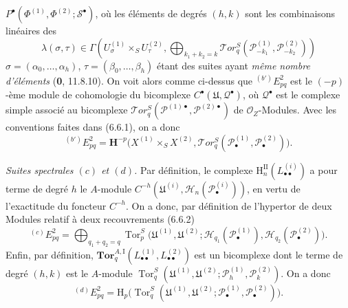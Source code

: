 \begin{env}[6.6.4]
$P^\bullet(\Phi^{(1)},\Phi^{(2)};\mathscr S^\bullet)$, où les éléments de
degrés $(h,k)$ sont les combinaisons linéaires des
\[
  \lambda(\sigma,\tau)\in
  \Gamma\left(U_\sigma^{(1)}\times_S U_\tau^{(2)},
    \bigoplus_{k_1+k_2=k}
    \mathscr{T}\!or_q^S
    (\mathscr P_{-k_1}^{(1)},\mathscr P_{-k_2}^{(2)})\right)
\]
$\sigma=(\alpha_0,\ldots,\alpha_h)$,
$\tau=(\beta_0,\ldots,\beta_h)$ étant des suites ayant \emph{même nombre
d'éléments} (\textbf{0}, 11.8.10). On voit alors comme ci-dessus que
${}^{(b')}E_{pq}^2$ est le $(-p)$-ème module de cohomologie du
bicomplexe $C^\bullet(\mathfrak U,\mathscr Q^\bullet)$, où
$\mathscr Q^\bullet$ est le complexe simple associé au bicomplexe
$\mathscr{T}\!or_q^S
(\mathscr P^{(1)\bullet},\mathscr P^{(2)\bullet})$ de
$\mathscr O_Z$-Modules. Avec les conventions faites dans (6.6.1), on a donc
\[
  {}^{(b')}E_{pq}^2
  =\mathbf H^{-p}\bigl(X^{(1)}\times_S X^{(2)},
    \mathscr{T}\!or_q^S
    (\mathscr P_\bullet^{(1)},\mathscr P_\bullet^{(2)})\bigr).
\]
\end{env}

\begin{env}[6.6.5]
\emph{Suites spectrales $(c)$ et $(d)$.} Par définition, le complexe
$\mathrm H_n^{\mathrm{II}}(L_{\bullet\bullet}^{(i)})$ a pour terme de degré
$h$ le $A$-module
$C^{-h}(\mathfrak U^{(i)},\mathscr H_n(\mathscr P_\bullet^{(i)}))$, en vertu
de l'exactitude du foncteur $C^{-h}$. On a donc, par définition de l'hypertor
de deux Modules relatif à deux recouvrements (6.6.2)
\[
  {}^{(c)}E_{pq}^2
  =\bigoplus_{q_1+q_2=q}
   \operatorname{Tor}_p^S
   \bigl(\mathfrak U^{(1)},\mathfrak U^{(2)};
         \mathscr H_{q_1}(\mathscr P_\bullet^{(1)}),
         \mathscr H_{q_2}(\mathscr P_\bullet^{(2)})\bigr).
\]
Enfin, par définition,
$\mathbf{Tor}_q^{A,\mathrm I}
(L_{\bullet\bullet}^{(1)},L_{\bullet\bullet}^{(2)})$ est un bicomplexe dont
le terme de degré $(h,k)$ est le $A$-module
$\operatorname{Tor}_q^S
(\mathfrak U^{(1)},\mathfrak U^{(2)};
 \mathscr P_h^{(1)},\mathscr P_k^{(2)})$. On a donc
\[
  {}^{(d)}E_{pq}^2
  =\mathrm H_p\bigl(
    \operatorname{Tor}_q^S
    (\mathfrak U^{(1)},\mathfrak U^{(2)};
     \mathscr P_\bullet^{(1)},\mathscr P_\bullet^{(2)})\bigr).
\]
\end{env}

